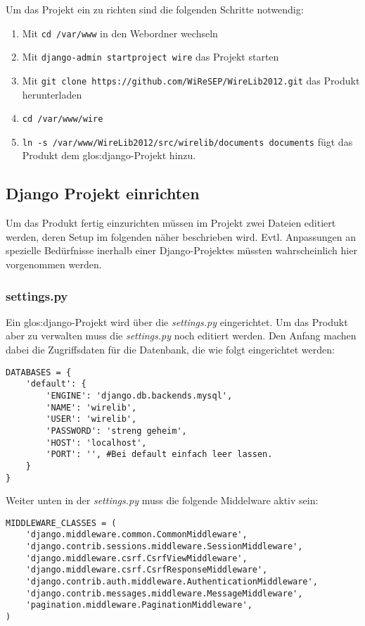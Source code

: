 Um das Projekt ein zu richten sind die folgenden Schritte notwendig:
\begin{enumerate}
  \item Mit \lstinline{cd /var/www} in den Webordner wechseln
  \item Mit \lstinline{django-admin startproject wire} das Projekt starten
  \item Mit \lstinline{git clone https://github.com/WiReSEP/WireLib2012.git}
	das Produkt herunterladen
  \item \lstinline{cd /var/www/wire}
  \item \lstinline{ln -s /var/www/WireLib2012/src/wirelib/documents documents}
	fügt das Produkt dem \Gls{glos:django}-Projekt hinzu.
\end{enumerate}

\subsection{Django Projekt einrichten}
Um das Produkt fertig einzurichten müssen im Projekt zwei Dateien editiert
werden, deren Setup im folgenden näher beschrieben wird. Evtl. Anpassungen an
spezielle Bedürfnisse inerhalb einer Django-Projektes müssten wahrscheinlich
hier vorgenommen werden.

\subsubsection{settings.py}
Ein \Gls{glos:django}-Projekt wird über die \emph{settings.py} eingerichtet.
Um das Produkt aber zu verwalten muss die \emph{settings.py} noch editiert
werden. Den Anfang machen dabei die Zugriffsdaten für die Datenbank, die wie
folgt eingerichtet werden:


\begin{lstlisting}
DATABASES = {
    'default': {
        'ENGINE': 'django.db.backends.mysql',
        'NAME': 'wirelib',
        'USER': 'wirelib', 
        'PASSWORD': 'streng geheim',
        'HOST': 'localhost',
        'PORT': '', #Bei default einfach leer lassen.
    }
}
\end{lstlisting}

Weiter unten in der \emph{settings.py} muss die folgende Middelware aktiv sein:
\begin{lstlisting}
MIDDLEWARE_CLASSES = (
    'django.middleware.common.CommonMiddleware',
    'django.contrib.sessions.middleware.SessionMiddleware',
    'django.middleware.csrf.CsrfViewMiddleware',
    'django.middleware.csrf.CsrfResponseMiddleware',
    'django.contrib.auth.middleware.AuthenticationMiddleware',
    'django.contrib.messages.middleware.MessageMiddleware',
    'pagination.middleware.PaginationMiddleware',
)
\end{lstlisting}

